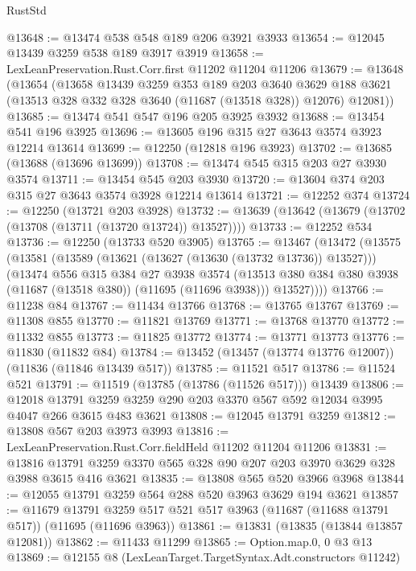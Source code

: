 \begin{lexlean}{RustStd}
\begin{coremodule}
@13648 := @13474 @538 @548 @189 @206 @3921 @3933
@13654 := @12045 @13439 @3259 @538 @189 @3917 @3919
@13658 := LexLeanPreservation.Rust.Corr.first @11202 @11204 @11206
@13679 := @13648
    (@13654
      (@13658
        @13439
        @3259
        @353
        @189
        @203
        @3640
        @3629
        @188
        @3621
        (@13513 @328 @332 @328 @3640 (@11687 (@13518 @328)) @12076)
        @12081))
@13685 := @13474 @541 @547 @196 @205 @3925 @3932
@13688 := @13454 @541 @196 @3925
@13696 := @13605 @196 @315 @27 @3643 @3574 @3923 @12214 @13614
@13699 := @12250 (@12818 @196 @3923)
@13702 := @13685 (@13688 (@13696 @13699))
@13708 := @13474 @545 @315 @203 @27 @3930 @3574
@13711 := @13454 @545 @203 @3930
@13720 := @13604 @374 @203 @315 @27 @3643 @3574 @3928 @12214 @13614
@13721 := @12252 @374
@13724 := @12250 (@13721 @203 @3928)
@13732 := @13639 (@13642 (@13679 (@13702 (@13708 (@13711 (@13720 @13724)) @13527))))
@13733 := @12252 @534
@13736 := @12250 (@13733 @520 @3905)
@13765 := @13467
    (@13472
      (@13575
        (@13581
          (@13589 (@13621 (@13627 (@13630 (@13732 @13736)) @13527)))
          (@13474
            @556
            @315
            @384
            @27
            @3938
            @3574
            (@13513 @380 @384 @380 @3938 (@11687 (@13518 @380)) (@11695 (@11696 @3938)))
            @13527))))
@13766 := @11238 @84
@13767 := @11434 @13766
@13768 := @13765 @13767
@13769 := @11308 @855
@13770 := @11821 @13769
@13771 := @13768 @13770
@13772 := @11332 @855
@13773 := @11825 @13772
@13774 := @13771 @13773
@13776 := @11830 (@11832 @84)
@13784 := @13452 (@13457 (@13774 @13776 @12007)) (@11836 (@11846 @13439 @517))
@13785 := @11521 @517
@13786 := @11524 @521
@13791 := @11519 (@13785 (@13786 (@11526 @517))) @13439
@13806 := @12018
    @13791
    @3259
    @3259
    @290
    @203
    @3370
    @567
    @592
    @12034
    @3995
    @4047
    @266
    @3615
    @483
    @3621
@13808 := @12045 @13791 @3259
@13812 := @13808 @567 @203 @3973 @3993
@13816 := LexLeanPreservation.Rust.Corr.fieldHeld @11202 @11204 @11206
@13831 := @13816 @13791 @3259 @3370 @565 @328 @90 @207 @203 @3970 @3629 @328 @3988 @3615 @416 @3621
@13835 := @13808 @565 @520 @3966 @3968
@13844 := @12055 @13791 @3259 @564 @288 @520 @3963 @3629 @194 @3621
@13857 := @11679
    @13791
    @3259
    @517
    @521
    @517
    @3963
    (@11687 (@11688 @13791 @517))
    (@11695 (@11696 @3963))
@13861 := @13831 (@13835 (@13844 @13857 @12081))
@13862 := @11433 @11299
@13865 := Option.map.{0, 0} @3 @13
@13869 := @12155 @8 (LexLeanTarget.TargetSyntax.Adt.constructors @11242)

\end{coremodule}
\end{lexlean}
